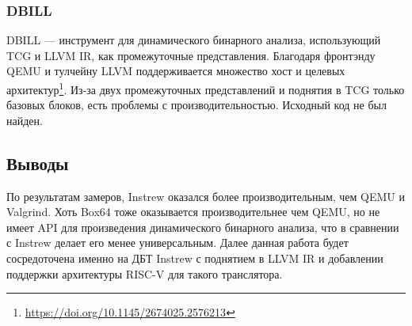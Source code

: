 \subsubsection{DBILL}
DBILL --- инструмент для динамического бинарного анализа, использующий TCG и LLVM IR, как промежуточные представления. Благодаря фронтэнду QEMU и тулчейну LLVM поддерживается множество хост и целевых архитектур\footnote{\href{https://doi.org/10.1145/2674025.2576213}{https://doi.org/10.1145/2674025.2576213}}. Из-за двух промежуточных представлений и поднятия в TCG только базовых блоков, есть проблемы с производительностью. Исходный код не был найден.

\subsection{Выводы}
По результатам замеров\cite{dissertation}, Instrew оказался более производительным, чем QEMU и Valgrind. Хоть Box64 тоже оказывается производительнее чем QEMU, но не имеет API для произведения динамического бинарного анализа, что в сравнении с Instrew делает его менее универсальным.
Далее данная работа будет сосредоточена именно на ДБТ Instrew с поднятием в LLVM IR и добавлении поддержки архитектуры RISC-V для такого транслятора.
